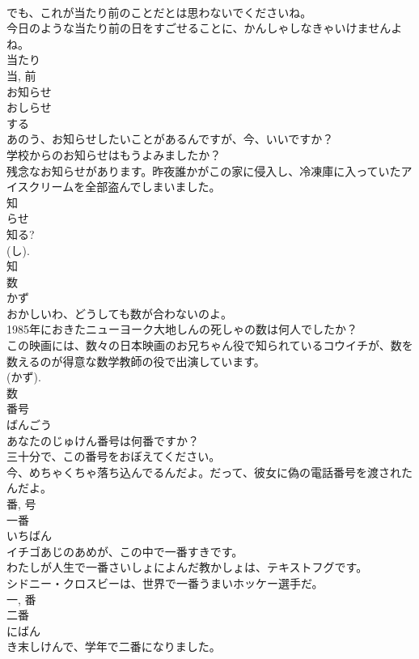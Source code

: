 \documentclass[8pt]{extreport}
\begin{document}
\begin{CJK}{UTF8}{min}
\\	でも、これが当たり前のことだとは思わないでくださいね。	
\\	今日のような当たり前の日をすごせることに、かんしゃしなきゃいけませんよね。	
\\	当たり 
\\	当, 前	
\\	お知らせ	
\\	おしらせ	
\\	する 
\\	あのう、お知らせしたいことがあるんですが、今、いいですか？	
\\	学校からのお知らせはもうよみましたか？	
\\	残念なお知らせがあります。昨夜誰かがこの家に侵入し、冷凍庫に入っていたアイスクリームを全部盗んでしまいました。	
\\	知 
\\	らせ 
\\	知る? 
\\	(し). 
\\	知	
\\	数	
\\	かず	
\\	おかしいわ、どうしても数が合わないのよ。	
\\	1985年におきたニューヨーク大地しんの死しゃの数は何人でしたか？	
\\	この映画には、数々の日本映画のお兄ちゃん役で知られているコウイチが、数を数えるのが得意な数学教師の役で出演しています。	
\\	(かず). 
\\	数	
\\	番号	
\\	ばんごう	
\\	あなたのじゅけん番号は何番ですか？	
\\	三十分で、この番号をおぼえてください。	
\\	今、めちゃくちゃ落ち込んでるんだよ。だって、彼女に偽の電話番号を渡されたんだよ。	
\\	番, 号	
\\	一番	
\\	いちばん	
\\	イチゴあじのあめが、この中で一番すきです。	
\\	わたしが人生で一番さいしょによんだ教かしょは、テキストフグです。	
\\	シドニー・クロスビーは、世界で一番うまいホッケー選手だ。	
\\	一, 番	
\\	二番	
\\	にばん	
\\	き末しけんで、学年で二番になりました。	

\end{CJK}
\end{document}
